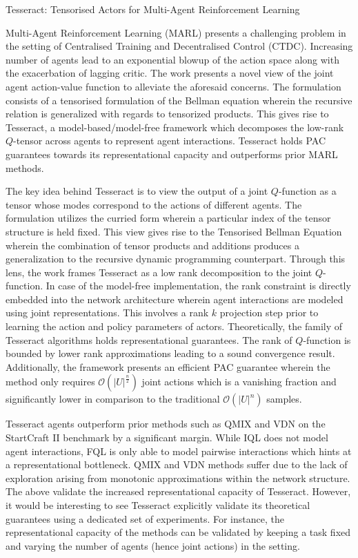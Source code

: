 \documentclass[12pt,letterpaper]{article}
\begin{document}
\begin{center}
  \large{Tesseract: Tensorised Actors for Multi-Agent Reinforcement Learning}
\end{center}

Multi-Agent Reinforcement Learning (MARL) presents a challenging problem in the setting of Centralised Training and Decentralised Control (CTDC). Increasing number of agents lead to an exponential blowup of the action space along with the exacerbation of lagging critic. The work presents a novel view of the joint agent action-value function to alleviate the aforesaid concerns. The formulation consists of a tensorised formulation of the Bellman equation wherein the recursive relation is generalized with regards to tensorized products. This gives rise to Tesseract, a model-based/model-free framework which decomposes the low-rank $Q$-tensor across agents to represent agent interactions. Tesseract holds PAC guarantees towards its representational capacity and outperforms prior MARL methods.

The key idea behind Tesseract is to view the output of a joint $Q$-function as a tensor whose modes correspond to the actions of different agents. The formulation utilizes the curried form wherein a particular index of the tensor structure is held fixed. This view gives rise to the Tensorised Bellman Equation wherein the combination of tensor products and additions produces a generalization to the recursive dynamic programming counterpart. Through this lens, the work frames Tesseract as a low rank decomposition to the joint $Q$-function. In case of the model-free implementation, the rank constraint is directly embedded into the network architecture wherein agent interactions are modeled using joint representations. This involves a rank $k$ projection step prior to learning the action and policy parameters of actors. Theoretically, the family of Tesseract algorithms holds representational guarantees. The rank of $Q$-function is bounded by lower rank approximations leading to a sound convergence result. Additionally, the framework presents an efficient PAC guarantee wherein the method only requires $\mathcal{O}(|U|^\frac{n}{2})$ joint actions which is a vanishing fraction and significantly lower in comparison to the traditional $\mathcal{O}(|U|^{n})$ samples.

Tesseract agents outperform prior methods such as QMIX and VDN on the StartCraft II benchmark by a significant margin. While IQL does not model agent interactions, FQL is only able to model pairwise interactions which hints at a representational bottleneck. QMIX and VDN methods suffer due to the lack of exploration arising from monotonic approximations within the network structure. The above validate the increased representational capacity of Tesseract. However, it would be interesting to see Tesseract explicitly validate its theoretical guarantees using a dedicated set of experiments. For instance, the representational capacity of the methods can be validated by keeping a task fixed and varying the number of agents (hence joint actions) in the setting.
\end{document}
